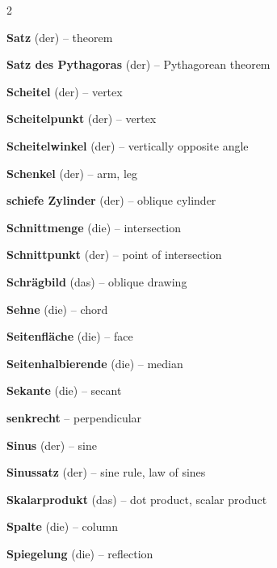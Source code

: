 \begin{multicols}{2}
\par\nopagebreak
\textbf{Satz} (der) -- theorem\dotfill\hyperref[e:347]{\pageref*{e:347}}\par
\textbf{Satz des Pythagoras} (der) -- Pythagorean theorem\dotfill\hyperref[e:190]{\pageref*{e:190}}\par
\textbf{Scheitel} (der) -- vertex\dotfill\hyperref[e:154]{\pageref*{e:154}}\par
\textbf{Scheitelpunkt} (der) -- vertex\dotfill\hyperref[e:129]{\pageref*{e:129}}\par
\textbf{Scheitelwinkel} (der) -- vertically opposite angle\dotfill\hyperref[e:166]{\pageref*{e:166}}\par
\textbf{Schenkel} (der) -- arm, leg\dotfill\hyperref[e:155]{\pageref*{e:155}}\par
\textbf{schiefe Zylinder} (der) -- oblique cylinder\dotfill\hyperref[e:238]{\pageref*{e:238}}\par
\textbf{Schnittmenge} (die) -- intersection\dotfill\hyperref[e:100]{\pageref*{e:100}}\par
\textbf{Schnittpunkt} (der) -- point of intersection\dotfill\hyperref[e:123]{\pageref*{e:123}}\par
\textbf{Schrägbild} (das) -- oblique drawing\dotfill\hyperref[e:254]{\pageref*{e:254}}\par
\textbf{Sehne} (die) -- chord\dotfill\hyperref[e:218]{\pageref*{e:218}}\par
\textbf{Seitenfläche} (die) -- face\dotfill\hyperref[e:247]{\pageref*{e:247}}\par
\textbf{Seitenhalbierende} (die) -- median\dotfill\hyperref[e:192]{\pageref*{e:192}}\par
\textbf{Sekante} (die) -- secant\dotfill\hyperref[e:219]{\pageref*{e:219}}\par
\textbf{senkrecht} -- perpendicular\dotfill\hyperref[e:151]{\pageref*{e:151}}\par
\textbf{Sinus} (der) -- sine\dotfill\hyperref[e:132]{\pageref*{e:132}}\par
\textbf{Sinussatz} (der) -- sine rule, law of sines\dotfill\hyperref[e:140]{\pageref*{e:140}}\par
\textbf{Skalarprodukt} (das) -- dot product, scalar product\dotfill\hyperref[e:306]{\pageref*{e:306}}\par
\textbf{Spalte} (die) -- column\dotfill\hyperref[e:323]{\pageref*{e:323}}\par
\textbf{Spiegelung} (die) -- reflection\dotfill\hyperref[e:172]{\pageref*{e:172}}\par

\end{multicols}
